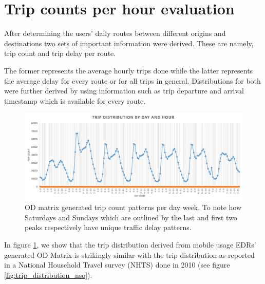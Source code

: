 \documentclass[12pt, a4paper]{report}
\theoremstyle{definition}
\theoremstyle{definition}%
\theoremstyle{definition}%
\theoremstyle{definition}%
\theoremstyle{definition}%
\theoremstyle{definition}%
\begin{document}

\section{Trip counts per hour evaluation}

After determining the users' daily routes between different origins and destinations two sets of important information were derived. These are namely, trip count and trip delay per route. 

The former represents the average hourly trips done while the latter represents the average delay for every route or for all trips in general. Distributions for both were further derived by using information such as trip departure and arrival timestamp which is available for every route. 

\begin{figure}[!]	
	\includegraphics[scale=0.5]{Trip_delay_per_day_week.jpg}
	\centering
	\caption[OD matrix generated trip count]{OD matrix generated trip count patterns per day week. To note how Saturdays and Sundays which are outlined by the last and first two peaks respectively have unique traffic delay patterns.}
	\label{fig:trip_distribution}
\end{figure}


In figure \ref{fig:trip_distribution}, we show that the trip distribution derived from mobile usage EDRs' generated OD Matrix is strikingly similar with the trip distribution as reported in a National Household Travel survey (NHTS) done in 2010 \cite{malta2011national} (see figure \ref{fig:trip_distribution_nso}). 
\end{document}
